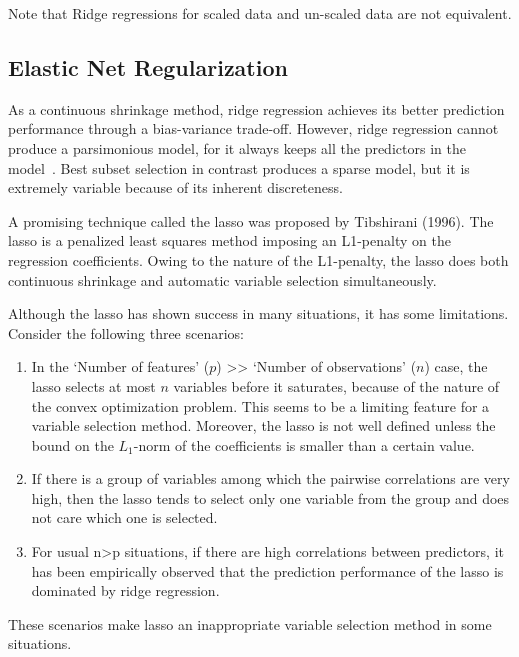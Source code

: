 Note that Ridge regressions for scaled data and un-scaled data are not equivalent.

\subsection{Elastic Net Regularization} %
\label{ssub:elastic_net_regularization}
As a continuous shrinkage method, ridge regression achieves its better
prediction performance through a bias-variance trade-off. However, ridge
regression cannot produce a parsimonious model, for it always keeps all the
predictors in the model~\cite{zou2005}. Best subset selection in contrast
produces a sparse model, but it is extremely variable because of its inherent
discreteness.

A promising technique called the lasso was proposed by Tibshirani (1996). The
lasso is a penalized least squares method imposing an L1-penalty on the
regression coefficients. Owing to the nature of the L1-penalty, the lasso does
both continuous shrinkage and automatic variable selection simultaneously.

Although the lasso has shown success in many situations, it has some
limitations. Consider the following three scenarios:
\begin{enumerate}
    \item In the `Number of features' ($p$) >> `Number of observations' ($n$) case,
    the lasso selects at most $n$ variables before it saturates, because of the
    nature of the convex optimization problem. This seems to be a limiting
    feature for a variable selection method. Moreover, the lasso is not well
    defined unless the bound on the $L_1$-norm of the coefficients is smaller
    than a certain value.

    \item If there is a group of variables among which the pairwise correlations are
    very high, then the lasso tends to select only one variable from the group
    and does not care which one is selected.

    \item For usual n>p situations, if there are high correlations between predictors,
    it has been empirically observed that the prediction performance of the
    lasso is dominated by ridge regression.

\end{enumerate}

These scenarios make lasso an inappropriate variable selection method in some situations.


